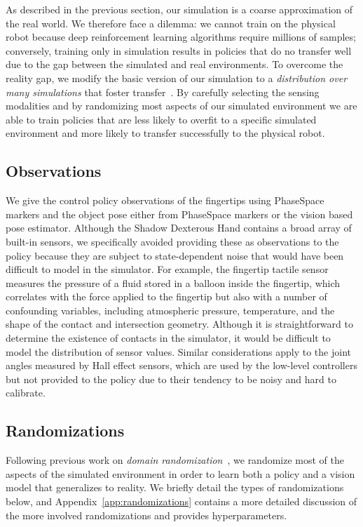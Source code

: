 
As described in the previous section, our simulation is a coarse approximation of the real world.
We therefore face a dilemma: we cannot train on the physical robot because deep reinforcement learning algorithms require millions of samples;
conversely, training only in simulation results in policies that do no transfer well due to the gap between the simulated and real environments.
To overcome the reality gap, we modify the basic version of our simulation to a \emph{distribution over many simulations} that foster transfer~\citep{DBLP:conf/rss/SadeghiL17, tobin2017domain, peng2017sim}.
By carefully selecting the sensing modalities and by randomizing most aspects of our simulated environment we are able to train policies that are less likely to overfit to a specific simulated environment and more likely to transfer successfully to the physical robot.



\subsection{Observations}

We give the control policy observations of the fingertips using PhaseSpace markers and the object pose either from PhaseSpace markers or the vision based pose estimator.
Although the Shadow Dexterous Hand contains a broad array of built-in sensors, we specifically avoided providing these as observations to the policy because they are subject to state-dependent noise that would have been difficult to model in the simulator.
For example, the fingertip tactile sensor measures the pressure of a fluid stored in a balloon inside the fingertip, which correlates with the force applied to the fingertip but also with a number of confounding variables, including atmospheric pressure, temperature, and the shape of the contact and intersection geometry.
Although it is straightforward to determine the existence of contacts in the simulator, it would be difficult to model the distribution of sensor values.
Similar considerations apply to the joint angles measured by Hall effect sensors, which are used by the low-level controllers but not provided to the policy due to their tendency to be noisy and hard to calibrate.

\subsection{Randomizations}
\label{subsection:randomizations}


Following previous work on \emph{domain randomization}~\citep{DBLP:conf/rss/SadeghiL17, tobin2017domain, peng2017sim},
we randomize most of the aspects of the simulated environment in order to learn both a policy and a vision model that generalizes to reality. We briefly detail the types of randomizations below, and Appendix~\ref{app:randomizations} contains a more detailed discussion of the more involved randomizations and provides hyperparameters. %

